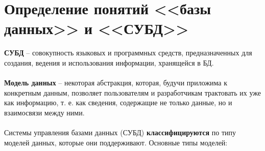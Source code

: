 \documentclass[a4paper, 12pt]{report}
\numberwithin{equation}{section}
\begin{document}
\section{Определение понятий <<базы данных>> и <<СУБД>>}
\textbf{СУБД} -- совокупность языковых и программных средств, предназначенных для создания, ведения и использования информации, хранящейся в БД.
\\\\
\textbf{Модель данных} -- некоторая абстракция, которая, будучи приложима к
конкретным данным, позволяет пользователям и разработчикам
трактовать их уже как информацию, т. е. как сведения, содержащие не
только данные, но и взаимосвязи между ними.
\\\\
Системы управления базами данных (СУБД) \textbf{классифицируются} по типу моделей данных, которые они поддерживают. Основные типы моделей:
\end{document}

